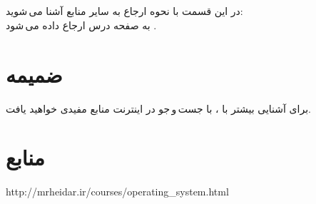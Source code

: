 \documentclass{article}
\begin{document}
\section{}
در این قسمت با نحوه ارجاع به سایر منابع آشنا می\,شوید:\\
\indent
به صفحه درس ارجاع داده می\,شود \cite{b1}.

\section{ضمیمه}
برای آشنایی بیشتر با \lr{\LaTeX}، با جست\,و\,جو در اینترنت منابع مفیدی خواهید یافت.


\section*{منابع}
\renewcommand{\section}[2]{}%
\begin{thebibliography}{99} %


\begin{LTRitems}

\resetlatinfont

 http://mrheidar.ir/courses/operating\_system.html
\end{LTRitems}

\end{thebibliography}
\end{document}
